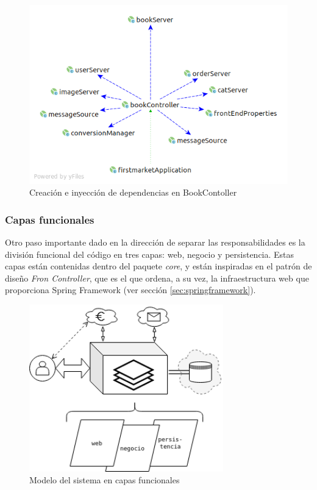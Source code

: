 \documentclass[a4paper]{article}
\begin{document}
	\begin{figure}[htb!]
		\centering
		\includegraphics[width=\textwidth]{di_bookController}
		\caption{Creación e inyección de dependencias en BookContoller}
		\label{fig:di_bookController}
	\end{figure}
    
    \subsubsection{Capas funcionales} \label{sec:design_layer}
    Otro paso importante dado en la dirección de separar las responsabilidades es la división funcional del código en tres capas: web, negocio y persistencia. Estas capas están contenidas dentro del paquete \emph{core}, y están inspiradas en el patrón de diseño \emph{Fron Controller}, que es el que ordena, a su vez, la infraestructura web que proporciona Spring Framework (ver sección \ref{sec:springframework}).
    
    \begin{figure}[htb!]
    	\centering
    	\includegraphics[width=0.75\textwidth,keepaspectratio]{desing_layer}
    	\caption{Modelo del sistema en capas funcionales}
    	\label{fig:desing_layer}
    \end{figure}
    
\end{document}
